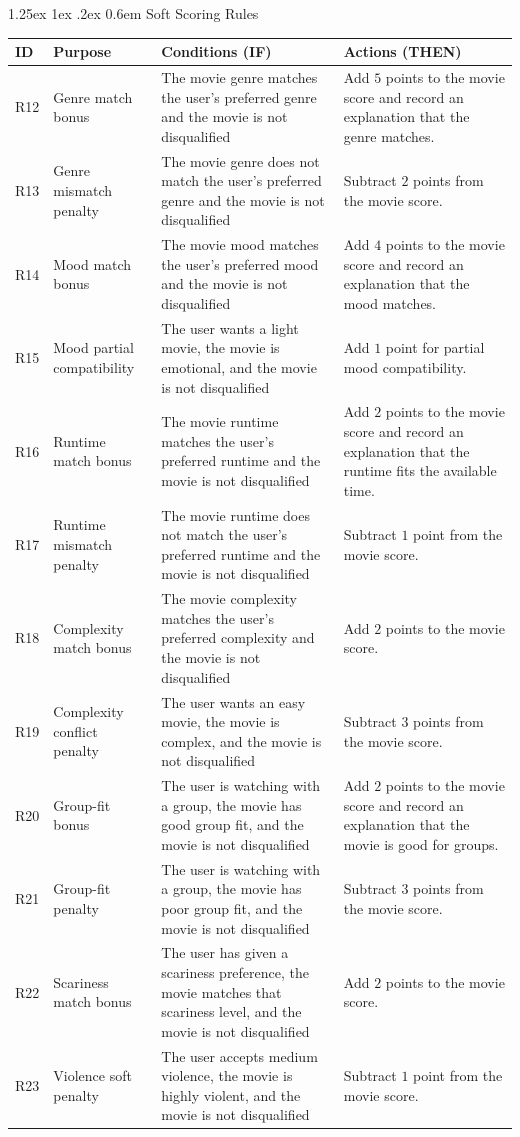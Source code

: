 \documentclass[11pt]{article}
\makeatletter
\renewcommand\paragraph{\@startsection{paragraph}{4}{\z@}%
  {1.25ex \@plus1ex \@minus.2ex}%
  {0.6em}%
  {\normalfont\normalsize\bfseries}}
\makeatother
\begin{document}
\paragraph{Soft Scoring Rules}
\begin{tabularx}{\textwidth}{@{}l l X X@{}}
\toprule
\textbf{ID} & \textbf{Purpose} & \textbf{Conditions (IF)} & \textbf{Actions (THEN)} \\
\midrule
R12 & Genre match bonus &
The movie genre matches the user's preferred genre and the movie is not disqualified &
Add $5$ points to the movie score and record an explanation that the genre matches. \\
R13 & Genre mismatch penalty &
The movie genre does not match the user's preferred genre and the movie is not disqualified &
Subtract $2$ points from the movie score. \\
R14 & Mood match bonus &
The movie mood matches the user's preferred mood and the movie is not disqualified &
Add $4$ points to the movie score and record an explanation that the mood matches. \\
R15 & Mood partial compatibility &
The user wants a light movie, the movie is emotional, and the movie is not disqualified &
Add $1$ point for partial mood compatibility. \\
R16 & Runtime match bonus &
The movie runtime matches the user's preferred runtime and the movie is not disqualified &
Add $2$ points to the movie score and record an explanation that the runtime fits the available time. \\
R17 & Runtime mismatch penalty &
The movie runtime does not match the user's preferred runtime and the movie is not disqualified &
Subtract $1$ point from the movie score. \\
R18 & Complexity match bonus &
The movie complexity matches the user's preferred complexity and the movie is not disqualified &
Add $2$ points to the movie score. \\
R19 & Complexity conflict penalty &
The user wants an easy movie, the movie is complex, and the movie is not disqualified &
Subtract $3$ points from the movie score. \\
R20 & Group-fit bonus &
The user is watching with a group, the movie has good group fit, and the movie is not disqualified &
Add $2$ points to the movie score and record an explanation that the movie is good for groups. \\
R21 & Group-fit penalty &
The user is watching with a group, the movie has poor group fit, and the movie is not disqualified &
Subtract $3$ points from the movie score. \\
R22 & Scariness match bonus &
The user has given a scariness preference, the movie matches that scariness level, and the movie is not disqualified &
Add $2$ points to the movie score. \\
R23 & Violence soft penalty &
The user accepts medium violence, the movie is highly violent, and the movie is not disqualified &
Subtract $1$ point from the movie score. \\
\bottomrule
\end{tabularx}
\end{document}
